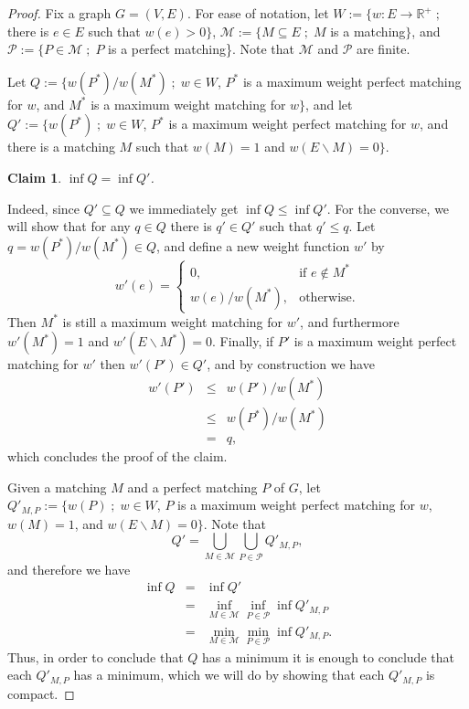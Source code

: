 \documentclass{article}
\newtheorem{claim}{Claim}[thm]
\begin{document}
\begin{proof}
Fix a graph $G = (V,E)$.
For ease of notation, let $W := \{ w:E\to\mathbb{R}^+ \;;\;$ there is $e \in E$ such that $w(e)>0\}$, $\mathcal{M} := \{M \subseteq E \;;\; M$ is a matching$\}$, and $\mathcal{P} := \{P \in \mathcal{M} \;;\; P$ is a perfect matching\}.
Note that $\mathcal{M}$ and $\mathcal{P}$ are finite.

Let $Q := \{ w(P^*)/w(M^*) \;;\; w\in W$, $P^*$ is a maximum weight perfect matching for $w$, and $M^*$ is a maximum weight matching for $w\}$, and let $Q' := \{ w(P^*) \;;\; w\in W$, $P^*$ is a maximum weight perfect matching for $w$, and there is a matching $M$ such that $w(M) = 1$ and $ w(E \smallsetminus M)=0 \}$.
	
\begin{claim}
	$\inf Q = \inf Q'$.
\end{claim}
Indeed, since $Q' \subseteq Q$ we immediately get $\inf Q \leq \inf Q'$.
For the converse, we will show that for any $q \in Q$ there is $q' \in Q'$ such that $q' \leq q$.
Let $q = w(P^*)/w(M^*) \in Q$, and define a new weight function $w'$ by 
\[w'(e) = 
	\begin{cases}
		0,& \text{if } e \not \in M^* \\
		w(e)/w(M^*), &\text{otherwise}.
	\end{cases} \]
Then $M^*$ is still a maximum weight matching for $w'$, and furthermore $w'(M^*) = 1$ and $w'(E \smallsetminus M^*) = 0$.
Finally, if $P'$ is a maximum weight perfect matching for $w'$ then $w'(P') \in Q'$, and by construction we have 
\[\begin{array}{rcl}
		w'(P') 
			&\leq& w(P')/w(M^*) \\
			&\leq& w(P^*)/w(M^*) \\
			&=&q,
	\end{array} \]
which concludes the proof of the claim.

Given a matching $M$ and a perfect matching $P$ of $G$, let $Q'_{M,P} := \{ w(P) \;;\; w\in W$, $P$ is a maximum weight perfect matching for $w$, $w(M)=1$, and $w(E \smallsetminus M)=0\}$.
Note that	
	\[ Q' = \displaystyle\bigcup_{M \in \mathcal{M}} \bigcup_{P \in \mathcal{P}} Q'_{M,P}, \]
and therefore we have
\[	\begin{array}{rcl}
			\inf Q
				&=& \inf Q' \\
				&=& \displaystyle\inf_{M \in \mathcal{M}} \inf_{P \in \mathcal{P}} \inf Q'_{M,P} \\
				&=& \displaystyle\min_{M \in \mathcal{M}} \min_{P \in \mathcal{P}} \inf Q'_{M,P}.
		\end{array} \]
Thus, in order to conclude that $Q$ has a minimum it is enough to conclude that each $Q'_{M,P}$ has a minimum, which we will do by showing that each $Q'_{M,P}$ is compact.


\end{proof}
\end{document}
